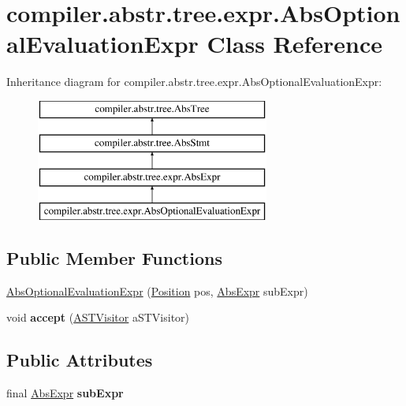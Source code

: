 \hypertarget{classcompiler_1_1abstr_1_1tree_1_1expr_1_1_abs_optional_evaluation_expr}{}\section{compiler.\+abstr.\+tree.\+expr.\+Abs\+Optional\+Evaluation\+Expr Class Reference}
\label{classcompiler_1_1abstr_1_1tree_1_1expr_1_1_abs_optional_evaluation_expr}
Inheritance diagram for compiler.\+abstr.\+tree.\+expr.\+Abs\+Optional\+Evaluation\+Expr\+:\begin{figure}[H]
\begin{center}
\leavevmode
\includegraphics[height=4.000000cm]{classcompiler_1_1abstr_1_1tree_1_1expr_1_1_abs_optional_evaluation_expr}
\end{center}
\end{figure}
\subsection*{Public Member Functions}
\begin{DoxyCompactItemize}
\item 
\hyperlink{classcompiler_1_1abstr_1_1tree_1_1expr_1_1_abs_optional_evaluation_expr_a6b2fd6d5ff53754473d376af65d79405}{Abs\+Optional\+Evaluation\+Expr} (\hyperlink{classcompiler_1_1_position}{Position} pos, \hyperlink{classcompiler_1_1abstr_1_1tree_1_1expr_1_1_abs_expr}{Abs\+Expr} sub\+Expr)
\item 
\mbox{\label{classcompiler_1_1abstr_1_1tree_1_1expr_1_1_abs_optional_evaluation_expr_a584d440f37c5df78d5ccde698553f434}} 
void {\bfseries accept} (\hyperlink{interfacecompiler_1_1abstr_1_1_a_s_t_visitor}{A\+S\+T\+Visitor} a\+S\+T\+Visitor)
\end{DoxyCompactItemize}
\subsection*{Public Attributes}
\begin{DoxyCompactItemize}
\item 
\mbox{\label{classcompiler_1_1abstr_1_1tree_1_1expr_1_1_abs_optional_evaluation_expr_a4ba82d397b2ee64eafbda8a2505e0259}} 
final \hyperlink{classcompiler_1_1abstr_1_1tree_1_1expr_1_1_abs_expr}{Abs\+Expr} {\bfseries sub\+Expr}
\end{DoxyCompactItemize}


